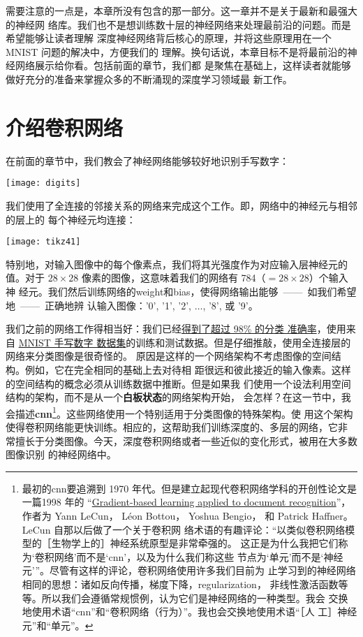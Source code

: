 需要注意的一点是，本章所没有包含的那一部分。这一章并不是关于最新和最强大的神经网
络库。我们也不是想训练数十层的神经网络来处理最前沿的问题。而是希望能够让读者理解
深度神经网络背后核心的原理，并将这些原理用在一个 MNIST 问题的解决中，方便我们的
理解。换句话说，本章目标不是将最前沿的神经网络展示给你看。包括前面的章节，我们都
是聚焦在基础上，这样读者就能够做好充分的准备来掌握众多的不断涌现的深度学习领域最
新工作。

\section{介绍卷积网络}
\label{sec:convolutional_networks}

在前面的章节中，我们教会了神经网络能够较好地识别手写数字：
\begin{center}
  \texttt{[image: digits]}
\end{center}

我们使用了全连接的邻接关系的网络来完成这个工作。即，网络中的神经元与相邻的层上的
每个神经元均连接：
\begin{center}
  \texttt{[image: tikz41]}
\end{center}

特别地，对输入图像中的每个像素点，我们将其光强度作为对应输入层神经元的值。对于
$28 \times 28$ 像素的图像，这意味着我们的网络有 784（$= 28 \times 28$）个输入神
经元。我们然后训练网络的\gls*{weight}和\gls*{bias}，使得网络输出能够~——~如我们希望地~——~正确地辨
认输入图像：'0', '1', '2', $\ldots$, '8', 或 '9'。

我们之前的网络工作得相当好：我们已经\hyperref[98percent]{得到了超过 98\% 的分类
  准确率}，使用来自 \hyperref[sec:learning_with_gradient_descent]{MNIST 手写数字
  数据集}的训练和测试数据。但是仔细推敲，使用全连接层的网络来分类图像是很奇怪的。
原因是这样的一个网络架构不考虑图像的空间结构。例如，它在完全相同的基础上去对待相
距很远和彼此接近的输入像素。这样的空间结构的概念必须从训练数据中推断。但是如果我
们使用一个设法利用空间结构的架构，而不是从一个\textbf{白板状态}的网络架构开始，
会怎样？在这一节中，我会描述\textbf{\gls{cnn}}\footnote{最初的\gls*{cnn}要追溯到
  1970 年代。但是建立起现代卷积网络学科的开创性论文是一篇1998 年的
  “\href{http://yann.lecun.com/exdb/publis/pdf/lecun-98.pdf}{Gradient-based
    learning applied to document recognition}”，作者为 Yann LeCun， Léon
  Bottou， Yoshua Bengio， 和 Patrick Haffner。LeCun 自那以后做了一个关于卷积网
  络术语的有趣评论：“以类似卷积网络模型的［生物学上的］神经系统原型是非常牵强的。
  这正是为什么我把它们称为‘卷积网络’而不是‘\gls*{cnn}’，以及为什么我们称这些
  节点为‘单元’而不是‘神经元’”。尽管有这样的评论，卷积网络使用许多我们目前为
  止学习到的神经网络相同的思想：诸如反向传播，梯度下降，\gls*{regularization}，
  非线性激活函数等等。所以我们会遵循常规惯例，认为它们是神经网络的一种类型。我会
  交换地使用术语“\gls*{cnn}”和“卷积网络（行为）”。我也会交换地使用术语“［人
    工］神经元”和“单元”。}。这些网络使用一个特别适用于分类图像的特殊架构。使
用这个架构使得卷积网络能更快训练。相应的，这帮助我们训练深度的、多层的网络，它非
常擅长于分类图像。今天，深度卷积网络或者一些近似的变化形式，被用在大多数图像识别
的神经网络中。

